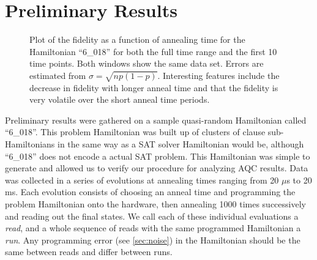 \chapter{Preliminary Results}
\label{chap:prelim}

\begin{figure}
\caption[Fidelity vs Time]{Plot of the fidelity as a function of annealing time for the Hamiltonian ``6\_018'' for both the full time range and the first 10 time points.  Both windows show the same data set.  Errors are estimated from $\sigma = \sqrt{np(1-p)}$.  Interesting features include the decrease in fidelity with longer anneal time and that the fidelity is very volatile over the short anneal time periods.}
	\label{fig:fidelity}
\end{figure}

Preliminary results were gathered on a sample quasi-random Hamiltonian called ``6\_018''.  This problem Hamiltonian was built up of clusters of clause sub-Hamiltonians in the same way as a SAT solver Hamiltonian would be, although ``6\_018'' does not encode a actual SAT problem.  This Hamiltonian was simple to generate and allowed us to verify our procedure for analyzing AQC results.
Data was collected in a series of evolutions at annealing times ranging from 20 $\mu$s to 20 ms.  Each evolution consists of choosing an anneal time and programming the problem Hamiltonian onto the hardware, then annealing 1000 times successively and reading out the final states.  We call each of these individual evaluations a \emph{read}, and a whole sequence of reads with the same programmed Hamiltonian a \emph{run}.  Any programming error (see \ref{sec:noise}) in the Hamiltonian should be the same between reads and differ between runs.

